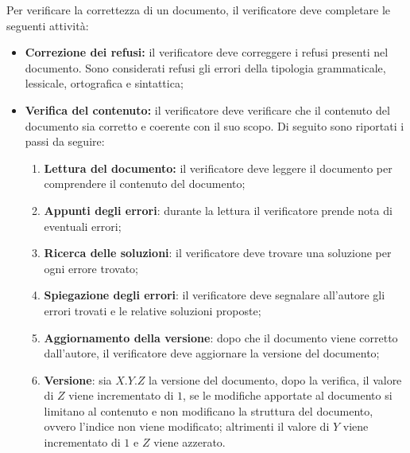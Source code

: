 
Per verificare la correttezza di un documento, il verificatore deve
completare le seguenti attività:
\begin{itemize}
	\item \textbf{Correzione dei refusi:} il verificatore deve correggere i
	      refusi presenti nel documento. Sono considerati refusi gli errori
	      della tipologia grammaticale, lessicale, ortografica e sintattica;

	\item \textbf{Verifica del contenuto:} il verificatore deve verificare
	      che il contenuto del documento sia corretto e coerente con il suo
	      scopo. Di seguito sono riportati i passi da seguire:
	      \begin{enumerate}
		      \item \textbf{Lettura del documento:} il verificatore deve
		            leggere il documento per comprendere il contenuto del
		            documento;

		      \item \textbf{Appunti degli errori}: durante la lettura il
		            verificatore prende nota di eventuali errori;

		      \item \textbf{Ricerca delle soluzioni}: il verificatore deve
		            trovare una soluzione per ogni errore trovato;

		      \item \textbf{Spiegazione degli errori}: il verificatore deve
		            segnalare all'autore gli errori trovati e le relative 
					soluzioni proposte;

		      \item \textbf{Aggiornamento della versione}: dopo che il documento
		            viene corretto dall'autore, il verificatore deve aggiornare
		            la versione del documento;

		      \item \textbf{Versione}: sia $X.Y.Z$ la versione del documento,
		            dopo la verifica, il valore di $Z$ viene incrementato di
		            $1$, se le modifiche apportate al documento si limitano al
		            contenuto e non modificano la struttura del documento,
		            ovvero l'indice non viene modificato; altrimenti il valore
		            di $Y$ viene incrementato di $1$ e $Z$ viene azzerato.
	      \end{enumerate}
\end{itemize}
